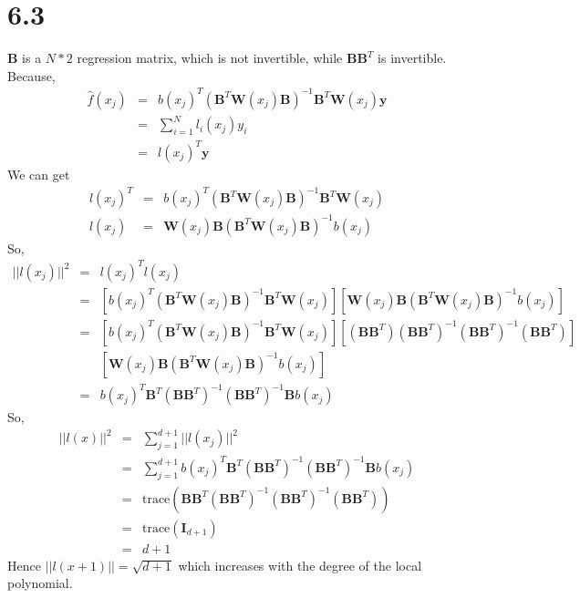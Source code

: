 \documentclass[11pt, oneside]{article}   	%
\begin{document}
\section{6.3}
$\mathbf{B}$ is a $N * 2$ regression matrix, which is not invertible, while $\mathbf{B}\mathbf{B}^T$ is invertible. Because,
\begin{eqnarray}
\hat{f}(x_j) &=& b(x_j)^T (\mathbf{B}^T \mathbf{W}(x_j)\mathbf{B})^{-1} \mathbf{B}^T \mathbf{W}(x_j)\mathbf{y}\\
&=&  \sum_{i = 1}^N l_i(x_j)y_i\\
&=& {l}(x_j)^T\mathbf{y}
\end{eqnarray}
We can get
\begin{eqnarray}
{l}(x_j)^T &=& b(x_j)^T (\mathbf{B}^T \mathbf{W}(x_j)\mathbf{B})^{-1} \mathbf{B}^T \mathbf{W}(x_j)\\
{l}(x_j) &=& \mathbf{W}(x_j) \mathbf{B} (\mathbf{B}^T \mathbf{W}(x_j)\mathbf{B})^{-1} b(x_j)
\end{eqnarray}
So, 
\begin{eqnarray}
||l(x_j)||^2 &=& {l}(x_j)^T {l}(x_j)\\
&=& [b(x_j)^T (\mathbf{B}^T \mathbf{W}(x_j)\mathbf{B})^{-1} \mathbf{B}^T \mathbf{W}(x_j)][\mathbf{W}(x_j) \mathbf{B} (\mathbf{B}^T \mathbf{W}(x_j)\mathbf{B})^{-1} b(x_j)]\\
&=& [b(x_j)^T (\mathbf{B}^T \mathbf{W}(x_j)\mathbf{B})^{-1} \mathbf{B}^T \mathbf{W}(x_j)][(\mathbf{B}\mathbf{B}^T) (\mathbf{B}\mathbf{B}^T)^{-1} (\mathbf{B}\mathbf{B}^T)^{-1} (\mathbf{B}\mathbf{B}^T)]\\
&& [\mathbf{W}(x_j) \mathbf{B} (\mathbf{B}^T \mathbf{W}(x_j)\mathbf{B})^{-1} b(x_j)] \nonumber \\
&=& b(x_j)^T \mathbf{B}^T (\mathbf{B}\mathbf{B}^T)^{-1} (\mathbf{B}\mathbf{B}^T)^{-1} \mathbf{B} b(x_j)
\end{eqnarray}
So,
\begin{eqnarray}
||l(x)||^2 &=& \sum_{j = 1}^{d+1} ||l(x_j)||^2\\
&=& \sum_{j = 1}^{d+1}  b(x_j)^T \mathbf{B}^T (\mathbf{B}\mathbf{B}^T)^{-1} (\mathbf{B}\mathbf{B}^T)^{-1} \mathbf{B} b(x_j)\\
&=& \mathrm{trace} (\mathbf{B}\mathbf{B}^T(\mathbf{B}\mathbf{B}^T)^{-1}(\mathbf{B}\mathbf{B}^T)^{-1}(\mathbf{B}\mathbf{B}^T))\\
&=& \mathrm{trace} (\mathbf{I}_{d+1})\\
&=& d+1
\end{eqnarray}
Hence $||l(x+1)|| = \sqrt{d+1}$ which increases with the degree of the local polynomial. 
\end{document}
